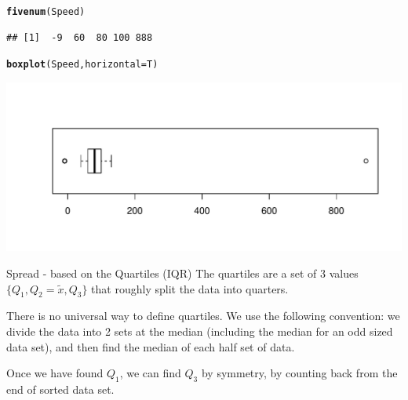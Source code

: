 \documentclass[t,xcolor=pdftex,dvipsnames,table]{beamer}
\makeatletter
\def\maxwidth{ %
  \ifdim\Gin@nat@width>\linewidth
    \linewidth
  \else
    \Gin@nat@width
  \fi
}
\newcommand{\hlstd}[1]{\textcolor[rgb]{0.345,0.345,0.345}{#1}}%
\newcommand{\hlkwc}[1]{\textcolor[rgb]{0.333,0.667,0.333}{#1}}%
\newcommand{\hlkwd}[1]{\textcolor[rgb]{0.737,0.353,0.396}{\textbf{#1}}}%
\newenvironment{kframe}{%
 \def\at@end@of@kframe{}%
 \ifinner\ifhmode%
  \def\at@end@of@kframe{\end{minipage}}%
  \begin{minipage}{\columnwidth}%
 \fi\fi%
 \def\FrameCommand##1{\hskip\@totalleftmargin \hskip-\fboxsep
 \colorbox{shadecolor}{##1}\hskip-\fboxsep
     \hskip-\linewidth \hskip-\@totalleftmargin \hskip\columnwidth}%
 \MakeFramed {\advance\hsize-\width
   \@totalleftmargin\z@ \linewidth\hsize
   \@setminipage}}%
 {\par\unskip\endMakeFramed%
 \at@end@of@kframe}
\newenvironment{knitrout}{}{} %
\makeatother
\begin{document}
\begin{frame}[fragile]{}
\begin{knitrout}
\color{fgcolor}\begin{kframe}
\begin{alltt}
\hlkwd{fivenum}\hlstd{(Speed)}
\end{alltt}
\begin{verbatim}
## [1]  -9  60  80 100 888
\end{verbatim}
\begin{alltt}
\hlkwd{boxplot}\hlstd{(Speed,} \hlkwc{horizontal}\hlstd{=T)}
\end{alltt}
\end{kframe}
\includegraphics[width=\maxwidth]{figure/unnamed-chunk-11-1} 

\end{knitrout}
\end{frame}
 
 
 
 
\begin{frame}[fragile,label=Quartiles]{Spread - based on the Quartiles (IQR)}
The quartiles are a set of 3 values $\{ Q_{1}, Q_{2} = \tilde{x}, Q_{3} \}$ that roughly split the data into quarters.

\vspace{.5cm}
There is no universal way to define quartiles.  
We use the following convention: we divide the data into 2 sets at the median (including the median for an odd sized data set), and then find the median of each half set of data.

\vspace{.5cm}
Once we have found $Q_{1}$, we can find $Q_{3}$ by symmetry, by counting back from the end of sorted data set.
\end{frame}
\end{document}
